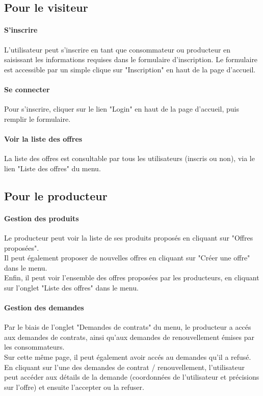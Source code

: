 \documentclass[12pt]{report}
\begin{document}
\subsection{Pour le visiteur}
\paragraph{S'inscrire}
L'utilisateur peut s'inscrire en tant que consommateur ou producteur en saisissant les informations requises dans le formulaire d'inscription.
Le formulaire est accessible par un simple clique sur "Inscription" en haut de la page d'accueil.

\paragraph{Se connecter}
Pour s'inscrire, cliquer sur le lien "Login" en haut de la page d'accueil, puis remplir le formulaire.

\paragraph{Voir la liste des offres}
La liste des offres est consultable par tous les utilisateurs (inscris ou non), via le lien "Liste des offres" du menu.

\subsection{Pour le producteur}
\paragraph{Gestion des produits}
Le producteur peut voir la liste de ses produits proposés en cliquant sur "Offres proposées".\\
Il peut également proposer de nouvelles offres en cliquant sur "Créer une offre" dans le menu.\\
Enfin, il peut voir l'ensemble des offres proposées par les producteurs, en cliquant sur l'onglet "Liste des offres" dans le menu.

\paragraph{Gestion des demandes}
Par le biais de l'onglet "Demandes de contrats" du menu, le producteur a accés aux demandes de contrats, ainsi qu'aux demandes de renouvellement émises par les consommateurs.\\
Sur cette même page, il peut également avoir accés au demandes qu'il a refusé.\\
En cliquant sur l'une des demandes de contrat / renouvellement, l'utilisateur peut accéder aux détails de la demande (coordonnées de l'utilisateur et précisions sur l'offre) et ensuite l'accepter ou la refuser.
\end{document}
